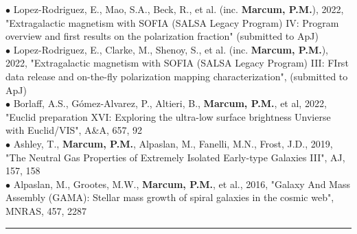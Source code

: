 {\scriptsize{$\bullet$}} Lopez-Rodriguez, E., Mao, S.A., Beck, R., et al. (inc. \textbf{Marcum, P.M.}), 2022, "Extragalactic magnetism with SOFIA (SALSA Legacy Program) IV: Program overview and first results on the polarization fraction" (submitted to ApJ)\\
{\scriptsize{$\bullet$}} Lopez-Rodriguez, E., Clarke, M., Shenoy, S., et al. (inc. \textbf{Marcum, P.M.}), 2022, "Extragalactic magnetism with SOFIA (SALSA Legacy Program) III: FIrst data release and on-the-fly polarization mapping characterization", (submitted to ApJ)\\
{\scriptsize{$\bullet$}} Borlaff, A.S., G{\'o}mez-Alvarez, P., Altieri, B., \textbf{Marcum, P.M.}, et al, 2022, "Euclid preparation XVI: Exploring the ultra-low surface brightness Unvierse with Euclid/VIS", A\&A, 657, 92\\
{\scriptsize{$\bullet$}} Ashley, T., \textbf{Marcum, P.M.}, Alpaslan, M., Fanelli, M.N., Frost, J.D., 2019, "The Neutral Gas Properties of Extremely Isolated Early-type Galaxies III", AJ, 157, 158\\
{\scriptsize{$\bullet$}} Alpaslan, M., Grootes, M.W., \textbf{Marcum, P.M.}, et al., 2016, "Galaxy And Mass Assembly (GAMA): Stellar mass growth of spiral galaxies in the cosmic web", MNRAS, 457, 2287
\medskip \hrule \vspace{5pt} \medskip